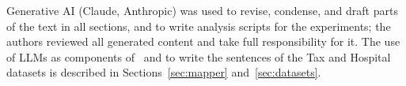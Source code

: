 Generative AI (Claude, Anthropic) was used to revise, condense, and draft parts of the text in all sections, and to write analysis scripts for the experiments; the authors reviewed all generated content and take full responsibility for it. The use of LLMs as components of \system\ and to write the sentences of the Tax and Hospital datasets is described in Sections~\ref{sec:mapper} and~\ref{sec:datasets}.
